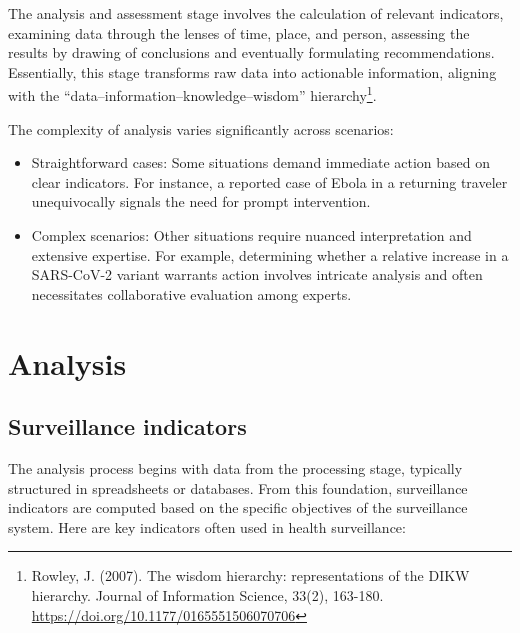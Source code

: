 \documentclass[
  letterpaper,
  DIV=11,
  numbers=noendperiod]{scrreprt}
\providecommand{\tightlist}{%
  \setlength{\itemsep}{0pt}\setlength{\parskip}{0pt}}\usepackage{longtable,booktabs,array}
\begin{document}
The analysis and assessment stage involves the calculation of relevant
indicators, examining data through the lenses of time, place, and
person, assessing the results by drawing of conclusions and eventually
formulating recommendations. Essentially, this stage transforms raw data
into actionable information, aligning with the
``data--information--knowledge--wisdom'' hierarchy\footnote{Rowley, J.
  (2007). The wisdom hierarchy: representations of the DIKW hierarchy.
  Journal of Information Science, 33(2), 163-180.
  \url{https://doi.org/10.1177/0165551506070706}}.

The complexity of analysis varies significantly across scenarios:

\begin{itemize}
\tightlist
\item
  Straightforward cases: Some situations demand immediate action based
  on clear indicators. For instance, a reported case of Ebola in a
  returning traveler unequivocally signals the need for prompt
  intervention.
\item
  Complex scenarios: Other situations require nuanced interpretation and
  extensive expertise. For example, determining whether a relative
  increase in a SARS-CoV-2 variant warrants action involves intricate
  analysis and often necessitates collaborative evaluation among
  experts.
\end{itemize}

\section{Analysis}\label{analysis}

\subsection{Surveillance indicators}\label{surveillance-indicators}

The analysis process begins with data from the processing stage,
typically structured in spreadsheets or databases. From this foundation,
surveillance indicators are computed based on the specific objectives of
the surveillance system. Here are key indicators often used in health
surveillance:
\end{document}
